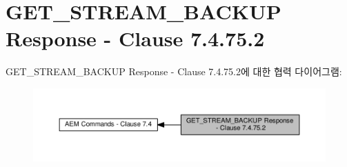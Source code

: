 \hypertarget{group__command__get__stream__backup__response}{}\section{G\+E\+T\+\_\+\+S\+T\+R\+E\+A\+M\+\_\+\+B\+A\+C\+K\+UP Response -\/ Clause 7.4.75.2}
\label{group__command__get__stream__backup__response}
G\+E\+T\+\_\+\+S\+T\+R\+E\+A\+M\+\_\+\+B\+A\+C\+K\+UP Response -\/ Clause 7.4.75.2에 대한 협력 다이어그램\+:
\nopagebreak
\begin{figure}[H]
\begin{center}
\leavevmode
\includegraphics[width=350pt]{group__command__get__stream__backup__response}
\end{center}
\end{figure}
